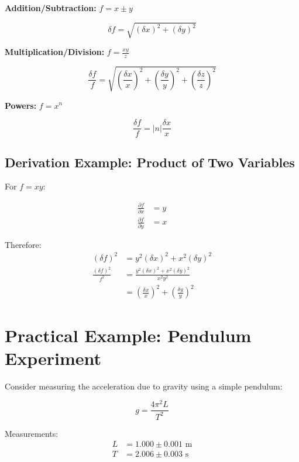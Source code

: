 \documentclass[twoside]{book}
\begin{document}
\textbf{Addition/Subtraction:} $f = x \pm y$

\begin{equation}
\delta f = \sqrt{(\delta x)^2 + (\delta y)^2}
\end{equation}

\textbf{Multiplication/Division:} $f = \frac{xy}{z}$

\begin{equation}
\frac{\delta f}{f} = \sqrt{\left(\frac{\delta x}{x}\right)^2 + \left(\frac{\delta y}{y}\right)^2 + \left(\frac{\delta z}{z}\right)^2}
\end{equation}

\textbf{Powers:} $f = x^n$

\begin{equation}
\frac{\delta f}{f} = |n|\frac{\delta x}{x}
\end{equation}

\subsection{Derivation Example: Product of Two Variables}

For $f = xy$:

\begin{align}
\frac{\partial f}{\partial x} &= y \\
\frac{\partial f}{\partial y} &= x
\end{align}

Therefore:
\begin{align}
(\delta f)^2 &= y^2(\delta x)^2 + x^2(\delta y)^2 \\
\frac{(\delta f)^2}{f^2} &= \frac{y^2(\delta x)^2 + x^2(\delta y)^2}{x^2y^2} \\
&= \left(\frac{\delta x}{x}\right)^2 + \left(\frac{\delta y}{y}\right)^2
\end{align}

\section{Practical Example: Pendulum Experiment}

Consider measuring the acceleration due to gravity using a simple pendulum:

\begin{equation}
g = \frac{4\pi^2 L}{T^2}
\end{equation}

Measurements:
\begin{align}
L &= 1.000 \pm 0.001 \text{ m} \\
T &= 2.006 \pm 0.003 \text{ s}
\end{align}
\end{document}
